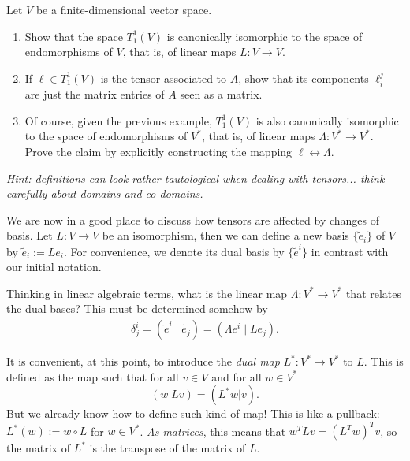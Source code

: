 \begin{exercise}\label{exe:iso_vs_endo}
	Let $V$ be a finite-dimensional vector space.
	\begin{enumerate}
		\item Show that the space $T^1_1(V)$ is canonically isomorphic to the space of endomorphisms of $V$, that is, of linear maps $L:V\to V$.

		\item If $\ell\in T^1_1(V)$ is the tensor associated to $A$, show that its components $\ell_i^j$ are just the matrix entries of $A$ seen as a matrix.

		\item Of course, given the previous example, $T^1_1(V)$ is also canonically isomorphic to the space of endomorphisms of $V^*$, that is, of linear maps $\Lambda:V^*\to V^*$.
		      Prove the claim by explicitly constructing the mapping $\ell \leftrightarrow \Lambda$.
	\end{enumerate}
	\textit{\small Hint: definitions can look rather tautological when dealing with tensors... think carefully about domains and co-domains.}
\end{exercise}

We are now in a good place to discuss how tensors are affected by changes of basis.
Let $L: V\to V$ be an isomorphism, then we can define a new basis $\{\widetilde e_i\}$ of $V$ by $\widetilde e_i := L e_i$. For convenience, we denote its dual basis by $\{\widetilde e^i\}$ in contrast with our initial notation.

Thinking in linear algebraic terms, what is the linear map $\Lambda:V^*\to V^*$ that relates the dual bases? This must be determined somehow by
\begin{align}\label{eq:vs_ch_bases}
	\delta^i_j = (\widetilde e^i \mid \widetilde e_j) = (\Lambda e^i \mid L e_j).
\end{align}

It is convenient, at this point, to introduce the \emph{dual map} $L^* : V^* \to V^*$ to $L$.
This is defined as the map such that for all $v\in V$ and for all $w\in V^*$
\begin{equation}\label{eq:dualmap}
	(w | Lv) = (L^* w | v).
\end{equation}
But we already know how to define such kind of map! This is like a pullback: $L^*(w) := w \circ L$ for $w\in V^*$.
\emph{As matrices}, this means that $w^T L v = (L^T w)^T v$, so the matrix of $L^*$ is the transpose of the matrix of $L$.

